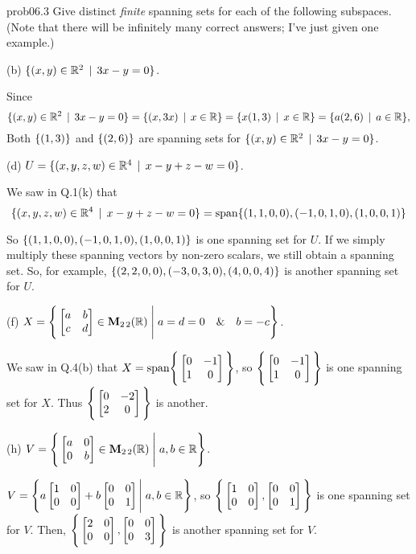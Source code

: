 \begin{sol}{prob06.3} Give  distinct {\it finite} spanning sets for each of the following subspaces. (Note that there will be infinitely many correct answers; I've just given one example.)
\medskip



(b)  $\{(x, y) \in \mathbb{R}^2\,\mid \, 3x - y=0  \}$.

\soln Since $$\{(x, y) \in \mathbb{R}^2\,\mid \, 3x - y=0  \}=\{(x, 3x)\,\mid \, x\in \mathbb{R} \}=\{x(1,3)\,\mid \, x\in \mathbb{R} \}=\{a(2,6)\,\mid \, a\in \mathbb{R} \},$$ Both $\{(1,3) \}$ and $\{(2,6) \}$ are spanning sets for $\{(x, y) \in \mathbb{R}^2\,\mid \, 3x - y=0  \}$.

\medskip
(d)  $U=\{(x, y, z, w) \in \mathbb{R}^4\,\mid \, x-y+z-w=0  \}$.

\soln We saw in Q.1(k) that $$\{(x, y, z, w) \in \mathbb{R}^4\,\mid \, x-y+z-w=0  \}=\textrm{span}\{(1,1,0,0),(-1, 0,1,0),(1,0,0,1) \}$$

So $\{(1,1,0,0),(-1, 0,1,0),(1,0,0,1)  \}$ is one spanning set for $U$. If we simply multiply these spanning vectors by non-zero scalars, we still obtain a spanning set. So, for example, $\{(2,2,0,0),(-3, 0,3,0),(4,0,0,4)  \}$ is another spanning set for $U$.

  \medskip

(f)  $X=\Bigg\{  \bmatrix a&b\\ c&d\endbmatrix \in \M_{2 \,2}(\R) \;\Bigg|\;a=d=0\quad \&\quad b=-c  \Bigg\}$.
  
\soln We saw in Q.4(b) that $X=\text{span}\Bigg\{ \bmatrix 0&-1\\ 1&0\endbmatrix\Bigg\}$, so $\Bigg\{ \bmatrix 0&-1\\ 1&0\endbmatrix\Bigg\}$ is one spanning set for $X$. Thus $\Bigg\{ \bmatrix 0&-2\\ 2&0\endbmatrix\Bigg\}$ is another. \medskip
%

(h)  $V=\Bigg\{  \bmatrix a&0\\ 0&b\endbmatrix \in \M_{2 \,2}(\R) \;\Bigg|\;  a, b \in \R\Bigg\}$. 

\soln $V=\Bigg\{a\bmatrix 1&0\\ 0&0\endbmatrix+ b\bmatrix 0&0\\ 0&1\endbmatrix \Bigg|\;  a, b \in \R\Bigg\}$, so $\Bigg\{\bmatrix 1&0\\ 0&0\endbmatrix, \bmatrix 0&0\\ 0&1\endbmatrix \Bigg\}$ is one spanning set for $V$. Then, $\Bigg\{\bmatrix 2&0\\ 0&0\endbmatrix, \bmatrix 0&0\\ 0&3\endbmatrix \Bigg\}$ is another spanning set for $V$.


\end{sol}
